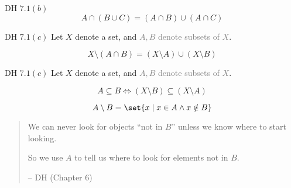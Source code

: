 \begin{frame}{}
  \begin{exampleblock}{DH $7.1 (b)$}
    \[
      A \cap (B \cup C) = (A \cap B) \cup (A \cap C)
    \]
  \end{exampleblock}
\end{frame}

\begin{frame}{}
  \begin{exampleblock}{DH $7.1 (c)$}
    Let $X$ denote a set, and \textcolor<2->{gray}{$A, B$ denote subsets of $X$}.

    \[
      X \setminus (A \cap B) = (X \setminus A) \cup (X \setminus B)
    \]
  \end{exampleblock}
\end{frame}

\begin{frame}{}
  \begin{exampleblock}{DH $7.1 (c)$}
    Let $X$ denote a set, and \textcolor{gray}{$A, B$ denote subsets of $X$}.

    \[
      A \subseteq B \iff (X \setminus B) \subseteq (X \setminus A)
    \]
  \end{exampleblock}
\end{frame}

\begin{frame}{}
  \[
    A \setminus B = \set{x \mid x \in A \land x \notin B}
  \]

  \begin{quote}
    We can never look for objects ``not in $B$'' unless we know where to start looking.

    So we use $A$ to tell us where to look for elements not in $B$.

    \hfill -- DH (Chapter 6)
  \end{quote}
\end{frame}
